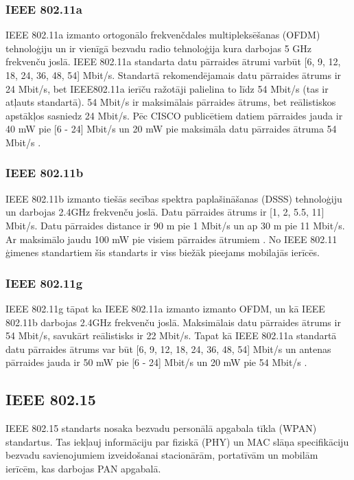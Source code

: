 \subsubsection{IEEE 802.11a}
IEEE 802.11a izmanto ortogonālo frekvenčdales multipleksēšanas (\acs{OFDM}) tehnoloģiju un ir vienīgā bezvadu radio tehnoloģija kura darbojas 5 GHz frekvenču joslā.  IEEE 802.11a standarta datu pārraides ātrumi varbūt [6, 9, 12, 18, 24, 36, 48, 54] Mbit/s. Standartā rekomendējamais datu pārraides ātrums ir 24 Mbit/s, bet IEEE802.11a ierīču ražotāji palielina to līdz 54 Mbit/s (tas ir atļauts standartā). 54 Mbit/s ir maksimālais pārraides ātrums, bet reālistiskos apstākļos sasniedz 24 Mbit/s. Pēc CISCO publicētiem datiem pārraides jauda ir 40 mW pie [6 - 24] Mbit/s un 20 mW pie maksimāla datu pārraides ātruma 54 Mbit/s \cite{cisco}.

\subsubsection{IEEE 802.11b}
IEEE 802.11b izmanto tiešās secības spektra paplašināšanas (\acs{DSSS}) tehnoloģiju un darbojas 2.4GHz frekvenču joslā. Datu pārraides ātrums ir [1, 2, 5.5, 11] Mbit/s. Datu pārraides distance ir 90 m pie 1 Mbit/s un ap 30 m pie 11 Mbit/s. Ar maksimālo jaudu 100 mW pie visiem pārraides ātrumiem \cite{cisco}. No IEEE 802.11 ģimenes standartiem šis standarts ir viss biežāk pieejams mobilajās ierīcēs.

\subsubsection{IEEE 802.11g}
IEEE 802.11g tāpat ka IEEE 802.11a izmanto izmanto OFDM, un kā IEEE 802.11b darbojas 2.4GHz frekvenču joslā. Maksimālais datu pārraides ātrums ir 54 Mbit/s, savukārt reālistisks ir 22 Mbit/s. Tapat kā IEEE 802.11a standartā datu pārraides ātrums var būt [6, 9, 12, 18, 24, 36, 48, 54] Mbit/s un antenas pārraides jauda ir 50 mW pie [6 - 24] Mbit/s un 20 mW pie 54 Mbit/s \cite{cisco}.

\subsection{IEEE 802.15}
IEEE 802.15 standarts nosaka bezvadu personālā apgabala tīkla (\acs{WPAN}) standartus. Tas iekļauj informāciju par fiziskā (PHY) un \acs{MAC} slāņa specifikāciju bezvadu savienojumiem izveidošanai stacionārām, portatīvām un mobilām ierīcēm, kas darbojas PAN apgabalā.

